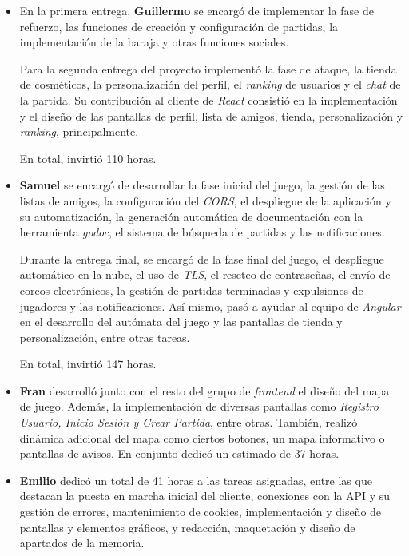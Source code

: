 \documentclass[11pt, a4paper, titlepage]{article}
\begin{document}
\begin{itemize}
    \item En la primera entrega, \textbf{Guillermo} se encargó de implementar la fase de refuerzo, las funciones de creación y configuración de partidas, la implementación de la baraja y otras funciones sociales. 
    
    Para la segunda entrega del proyecto implementó la fase de ataque, la tienda de cosméticos, la personalización del perfil, el \textit{ranking} de usuarios y el \textit{chat} de la partida. Su contribución al cliente de \textit{React} consistió en la implementación y el diseño de las pantallas de perfil, lista de amigos, tienda, personalización y \textit{ranking}, principalmente.
    
    En total, invirtió 110 horas.

    \item \textbf{Samuel} se encargó de desarrollar la fase inicial del juego, la gestión de las listas de amigos, la configuración del \textit{CORS}, el despliegue de la aplicación y su automatización, la generación automática de documentación con la herramienta \textit{godoc}, el sistema de búsqueda de partidas y las notificaciones.
    
    Durante la entrega final, se encargó de la fase final del juego, el despliegue automático en la nube, el uso de \textit{TLS}, el reseteo de contraseñas, el envío de coreos electrónicos, la gestión de partidas terminadas y expulsiones de jugadores y las notificaciones. Así mismo, pasó a ayudar al equipo de \textit{Angular} en el desarrollo del autómata del juego y las pantallas de tienda y personalización, entre otras tareas.
    
    En total, invirtió 147 horas.

    \item \textbf{Fran} desarrolló junto con el resto del grupo de \textit{frontend} el diseño del mapa de juego. Además, la implementación de diversas pantallas como \textit{Registro Usuario, Inicio Sesión y Crear Partida}, entre otras. También, realizó dinámica adicional del mapa como ciertos botones, un mapa informativo o pantallas de avisos. En conjunto dedicó un estimado de 37 horas.

    \item \textbf{Emilio} dedicó un total de 41 horas a las tareas asignadas, entre las que destacan la puesta en marcha inicial del cliente, conexiones con la API y su gestión de errores, mantenimiento de cookies, implementación y diseño de pantallas y elementos gráficos, y redacción, maquetación y diseño de apartados de la memoria.


\end{itemize}
\end{document}
